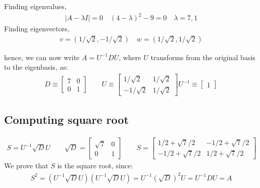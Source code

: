 \documentclass[11pt]{book}
\begin{document}
Finding eigenvalues,
\begin{align*}
    |A - \lambda I| = 0 \quad (4 - \lambda)^2 - 9 = 0 \quad \lambda = 7, 1
\end{align*}
Finding eigenvectors,
\begin{align*}
    v = (1/\sqrt 2, -1/\sqrt 2) \quad w = (1/\sqrt 2, 1/\sqrt 2)
\end{align*}

hence, we can now write $A = U^{-1} D U$, where $U$ transforms
from the original basis to the eigenbasis, as:
\begin{align*}
    D \equiv \begin{bmatrix} 7 & 0 \\ 0 & 1 \end{bmatrix} \qquad
    U \equiv \begin{bmatrix} 
        1/\sqrt 2 & 1/\sqrt 2 \\
        -1/\sqrt 2 & 1/\sqrt 2
    \end{bmatrix}
    U^{-1} \equiv \begin{bmatrix} 1
    \end{bmatrix}
\end{align*}

\subsection{Computing square root}
 \begin{align*}
     S = U^{-1} \sqrt D U 
     \qquad \sqrt D = \begin{bmatrix} \sqrt 7 & 0 \\ 0 & 1 \end{bmatrix}
     \qquad S = 
     \begin{bmatrix}
         1/2 + \sqrt7/2 & -1/2 + \sqrt7/2 \\
         -1/2 + \sqrt 7/2 & 1/2 + \sqrt7 /2
     \end{bmatrix}
 \end{align*}
 We prove that $S$ is the square root, since:
 \begin{align*}
     S^2 = (U^{-1} \sqrt D U) (U^{-1} \sqrt D U) = U^{-1} (\sqrt D)^2 U = U^{-1} D U = A
 \end{align*}
 
\end{document}
